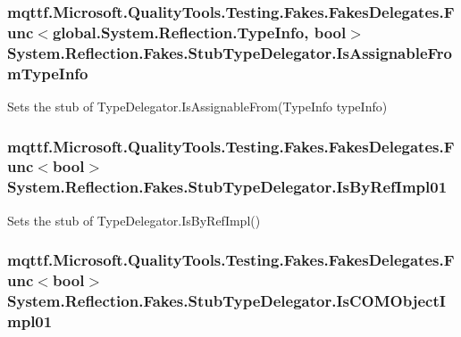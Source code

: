 \hypertarget{class_system_1_1_reflection_1_1_fakes_1_1_stub_type_delegator_a21121b60fd75bdd56d3cfd4493e9efb0}{
\subsubsection[{Is\-Assignable\-From\-Type\-Info}]{\setlength{\rightskip}{0pt plus 5cm}mqttf.\-Microsoft.\-Quality\-Tools.\-Testing.\-Fakes.\-Fakes\-Delegates.\-Func$<$global.\-System.\-Reflection.\-Type\-Info, bool$>$ System.\-Reflection.\-Fakes.\-Stub\-Type\-Delegator.\-Is\-Assignable\-From\-Type\-Info}}\label{class_system_1_1_reflection_1_1_fakes_1_1_stub_type_delegator_a21121b60fd75bdd56d3cfd4493e9efb0}


Sets the stub of Type\-Delegator.\-Is\-Assignable\-From(\-Type\-Info type\-Info)

\hypertarget{class_system_1_1_reflection_1_1_fakes_1_1_stub_type_delegator_a174761d7926ef8b6c1fe858bd77e913d}{
\subsubsection[{Is\-By\-Ref\-Impl01}]{\setlength{\rightskip}{0pt plus 5cm}mqttf.\-Microsoft.\-Quality\-Tools.\-Testing.\-Fakes.\-Fakes\-Delegates.\-Func$<$bool$>$ System.\-Reflection.\-Fakes.\-Stub\-Type\-Delegator.\-Is\-By\-Ref\-Impl01}}\label{class_system_1_1_reflection_1_1_fakes_1_1_stub_type_delegator_a174761d7926ef8b6c1fe858bd77e913d}


Sets the stub of Type\-Delegator.\-Is\-By\-Ref\-Impl()

\hypertarget{class_system_1_1_reflection_1_1_fakes_1_1_stub_type_delegator_a610e48f63a41bfcb2a89b971820af683}{
\subsubsection[{Is\-C\-O\-M\-Object\-Impl01}]{\setlength{\rightskip}{0pt plus 5cm}mqttf.\-Microsoft.\-Quality\-Tools.\-Testing.\-Fakes.\-Fakes\-Delegates.\-Func$<$bool$>$ System.\-Reflection.\-Fakes.\-Stub\-Type\-Delegator.\-Is\-C\-O\-M\-Object\-Impl01}}\label{class_system_1_1_reflection_1_1_fakes_1_1_stub_type_delegator_a610e48f63a41bfcb2a89b971820af683}



